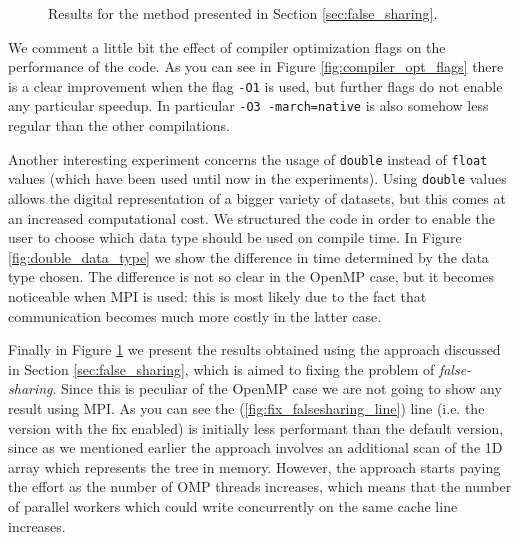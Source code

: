 \documentclass{article}
\begin{document}
\begin{figure}[t!]
    \centering
    \caption{Results for the method presented in Section \ref{sec:false_sharing}.}
    \label{fig:false_sharing}
\end{figure}

We comment a little bit the effect of compiler optimization flags on the
performance of the code. As you can see in Figure \ref{fig:compiler_opt_flags}
there is a clear improvement when the flag \texttt{-O1} is used, but further
flags do not enable any particular speedup. In particular
\texttt{-O3 -march=native} is also somehow less regular than the other
compilations.

Another interesting experiment concerns the usage of \texttt{double} instead of
\texttt{float} values (which have been used until now in the experiments). Using
\texttt{double} values allows the digital representation of a bigger variety
of datasets, but this comes at an increased computational cost. We structured
the code in order to enable the user to choose which data type should be used
on compile time. In Figure \ref{fig:double_data_type} we show the difference
in time determined by the data type chosen. The difference is not so clear in
the OpenMP case, but it becomes noticeable when MPI is used: this is most likely
due to the fact that communication becomes much more costly in the latter case.

Finally in Figure \ref{fig:false_sharing} we present the results obtained using
the approach discussed in Section \ref{sec:false_sharing}, which is aimed to
fixing the problem of \emph{false-sharing}. Since this is peculiar of the OpenMP
case we are not going to show any result using MPI. As you can see the
(\ref{fig:fix_falsesharing_line}) line (i.e. the version with the fix enabled)
is initially less performant than the default version, since as we mentioned
earlier the approach involves an additional scan of the 1D array which
represents the tree in memory. However, the approach starts paying the effort as
the number of OMP threads increases, which means that the number of parallel
workers which could write concurrently on the same cache line increases.
\end{document}
